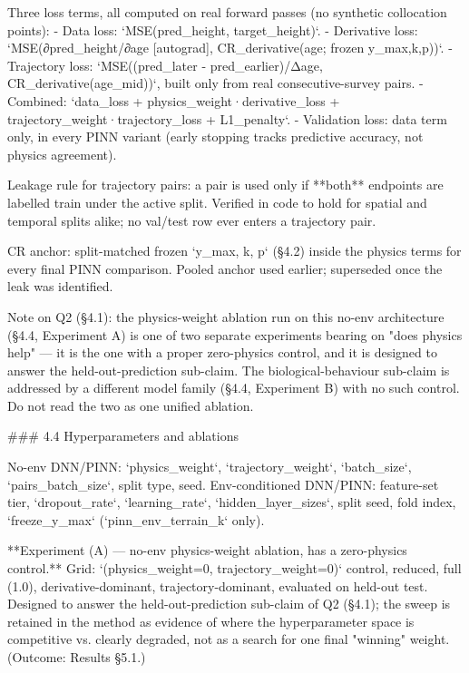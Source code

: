 \documentclass[11pt,a4paper]{report}
\begin{document}
Three loss terms, all computed on real forward passes (no synthetic collocation points):
- Data loss: `MSE(pred_height, target_height)`.
- Derivative loss: `MSE(∂pred_height/∂age [autograd], CR_derivative(age; frozen y_max,k,p))`.
- Trajectory loss: `MSE((pred_later - pred_earlier)/Δage, CR_derivative(age_mid))`, built only from real consecutive-survey pairs.
- Combined: `data_loss + physics_weight·derivative_loss + trajectory_weight·trajectory_loss + L1_penalty`.
- Validation loss: data term only, in every PINN variant (early stopping tracks predictive accuracy, not physics agreement).

Leakage rule for trajectory pairs: a pair is used only if **both** endpoints are labelled train under the active split. Verified in code to hold for spatial and temporal splits alike; no val/test row ever enters a trajectory pair.

CR anchor: split-matched frozen `y_max, k, p` (§4.2) inside the physics terms for every final PINN comparison. Pooled anchor used earlier; superseded once the leak was identified.

Note on Q2 (§4.1): the physics-weight ablation run on this no-env architecture (§4.4, Experiment A) is one of two separate experiments bearing on "does physics help" — it is the one with a proper zero-physics control, and it is designed to answer the held-out-prediction sub-claim. The biological-behaviour sub-claim is addressed by a different model family (§4.4, Experiment B) with no such control. Do not read the two as one unified ablation.

### 4.4 Hyperparameters and ablations

No-env DNN/PINN: `physics_weight`, `trajectory_weight`, `batch_size`, `pairs_batch_size`, split type, seed.
Env-conditioned DNN/PINN: feature-set tier, `dropout_rate`, `learning_rate`, `hidden_layer_sizes`, split seed, fold index, `freeze_y_max` (`pinn_env_terrain_k` only).

**Experiment (A) — no-env physics-weight ablation, has a zero-physics control.** Grid: `(physics_weight=0, trajectory_weight=0)` control, reduced, full (1.0), derivative-dominant, trajectory-dominant, evaluated on held-out test. Designed to answer the held-out-prediction sub-claim of Q2 (§4.1); the sweep is retained in the method as evidence of where the hyperparameter space is competitive vs. clearly degraded, not as a search for one final "winning" weight. (Outcome: Results §5.1.)
\end{document}
